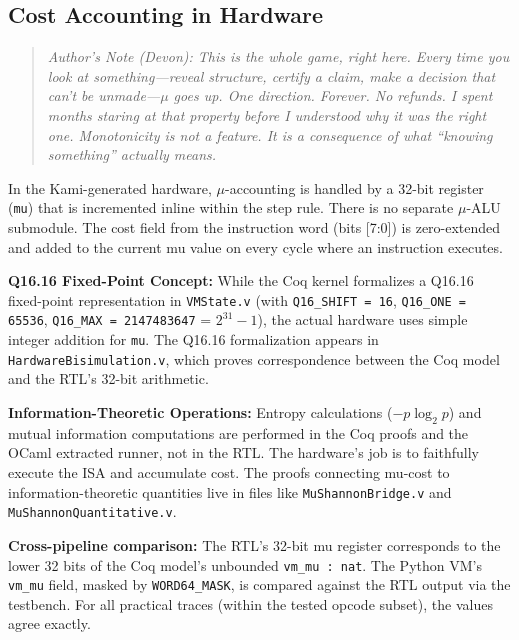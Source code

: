 
\subsection{Cost Accounting in Hardware}

\begin{quote}
\textit{Author's Note (Devon): This is the whole game, right here. Every time you look at something---reveal structure, certify a claim, make a decision that can't be unmade---$\mu$ goes up. One direction. Forever. No refunds. I spent months staring at that property before I understood why it was the right one. Monotonicity is not a feature. It is a consequence of what ``knowing something'' actually means.}
\end{quote}

In the Kami-generated hardware, $\mu$-accounting is handled by a 32-bit register (\texttt{mu}) that is incremented inline within the step rule. There is no separate $\mu$-ALU submodule. The cost field from the instruction word (bits [7:0]) is zero-extended and added to the current mu value on every cycle where an instruction executes.

\textbf{Q16.16 Fixed-Point Concept:} While the Coq kernel formalizes a Q16.16 fixed-point representation in \texttt{VMState.v} (with \texttt{Q16\_SHIFT = 16}, \texttt{Q16\_ONE = 65536}, \texttt{Q16\_MAX = 2147483647} = $2^{31}-1$), the actual hardware uses simple integer addition for \texttt{mu}. The Q16.16 formalization appears in \texttt{HardwareBisimulation.v}, which proves correspondence between the Coq model and the RTL's 32-bit arithmetic.

\textbf{Information-Theoretic Operations:} Entropy calculations ($-p \log_2 p$) and mutual information computations are performed in the Coq proofs and the OCaml extracted runner, not in the RTL. The hardware's job is to faithfully execute the ISA and accumulate cost. The proofs connecting mu-cost to information-theoretic quantities live in files like \texttt{MuShannonBridge.v} and \texttt{MuShannonQuantitative.v}.

\textbf{Cross-pipeline comparison:} The RTL's 32-bit mu register corresponds to the lower 32 bits of the Coq model's unbounded \texttt{vm\_mu : nat}. The Python VM's \texttt{vm\_mu} field, masked by \texttt{WORD64\_MASK}, is compared against the RTL output via the testbench. For all practical traces (within the tested opcode subset), the values agree exactly.

